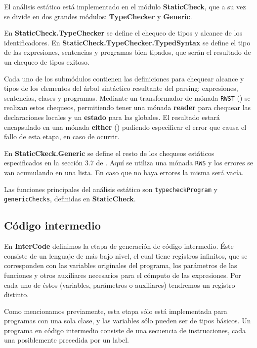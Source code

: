 \documentclass[a4paper,10pt]{article}
\begin{document}
El análisis estático está implementado en el módulo \textbf{StaticCheck}, que a su vez se divide en dos grandes módulos: \textbf{TypeChecker} y
\textbf{Generic}.

En \textbf{StaticCheck.TypeChecker} se define el chequeo de tipos y alcance de los identificadores. En \textbf{StaticCheck.TypeChecker.TypedSyntax} 
se define el tipo de las expresiones, sentencias y programas bien tipados, que serán el resultado de un chequeo de tipos exitoso. 

Cada uno de los submódulos contienen las definiciones para chequear alcance y tipos de los elementos del árbol sintáctico resultante del parsing: 
expresiones, sentencias, clases y programas. Mediante un transformador de mónada \verb|RWST| (\cite{rwst}) se realizan estos chequeos, permitiendo
tener una mónada \textbf{reader} para chequear las declaraciones locales y un \textbf{estado} para las globales. El resultado estará encapsulado
en una mónada \textbf{either} (\cite{either}) pudiendo especificar el error que causa el fallo de esta etapa, en caso de ocurrir.

En \textbf{StaticCkeck.Generic} se define el resto de los chequeos estáticos especificados en la sección 3.7 de \cite{COMPISpec}. Aquí se utiliza
una mónada \verb|RWS| y los errores se van acumulando en una lista. En caso que no haya errores la misma será vacía.


Las funciones principales del análisis estático son \verb|typecheckProgram| y \newline
\verb|genericChecks|, definidas en \textbf{StaticCheck}.


\subsection{Código intermedio}

En \textbf{InterCode} definimos la etapa de generación de código intermedio. Éste consiste de un lenguaje de más bajo nivel, el cual 
tiene registros infinitos, que se corresponden con las variables originales del programa, los parámetros de las funciones y otros auxiliares 
necesarios para el cómputo de las expresiones. Por cada uno de éstos (variables, parámetros o auxiliares) tendremos un registro distinto.

Como mencionamos previamente, esta etapa sólo está implementada para programas con una 
sola clase, y las variables sólo pueden ser de tipos básicos. Un programa en código intermedio consiste de una secuencia de instrucciones, 
cada una posiblemente precedida por un label. 
\end{document}
